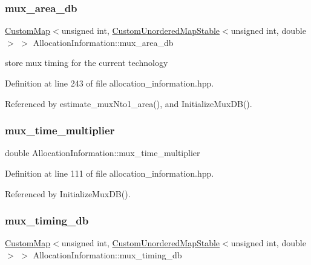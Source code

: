 \subsubsection{\texorpdfstring{mux\+\_\+area\+\_\+db}{mux\_area\_db}}
{\footnotesize\ttfamily \hyperlink{custom__map_8hpp_a18ca01763abbe3e5623223bfe5aaac6b}{Custom\+Map}$<$unsigned int, \hyperlink{custom__map_8hpp_a7314a7df1cdb3a3acf478ab86e95c226}{Custom\+Unordered\+Map\+Stable}$<$unsigned int, double$>$ $>$ Allocation\+Information\+::mux\+\_\+area\+\_\+db\hspace{0.3cm}{\ttfamily [private]}}



store mux timing for the current technology 



Definition at line 243 of file allocation\+\_\+information.\+hpp.



Referenced by estimate\+\_\+mux\+Nto1\+\_\+area(), and Initialize\+Mux\+D\+B().

\mbox{\label{classAllocationInformation_a439a1f4328391e8ff2d88cad68f5f5a8}} 
\subsubsection{\texorpdfstring{mux\+\_\+time\+\_\+multiplier}{mux\_time\_multiplier}}
{\footnotesize\ttfamily double Allocation\+Information\+::mux\+\_\+time\+\_\+multiplier\hspace{0.3cm}{\ttfamily [private]}}



Definition at line 111 of file allocation\+\_\+information.\+hpp.



Referenced by Initialize\+Mux\+D\+B().

\mbox{\label{classAllocationInformation_aceaa6d5e7adf99a1aa820c8626324657}} 
\subsubsection{\texorpdfstring{mux\+\_\+timing\+\_\+db}{mux\_timing\_db}}
{\footnotesize\ttfamily \hyperlink{custom__map_8hpp_a18ca01763abbe3e5623223bfe5aaac6b}{Custom\+Map}$<$unsigned int, \hyperlink{custom__map_8hpp_a7314a7df1cdb3a3acf478ab86e95c226}{Custom\+Unordered\+Map\+Stable}$<$unsigned int, double$>$ $>$ Allocation\+Information\+::mux\+\_\+timing\+\_\+db\hspace{0.3cm}{\ttfamily [private]}}



